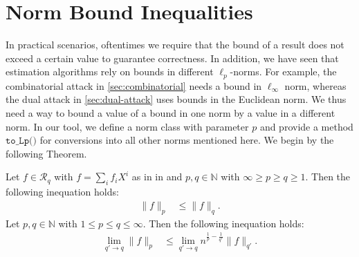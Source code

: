 \section{Norm Bound Inequalities} \label{sec:norm-bounds}%
In practical scenarios, oftentimes we require that the bound of a result does not exceed a certain value to guarantee correctness. In addition, we have seen that estimation algorithms rely on bounds in different $\ell_p$-norms. For example, the combinatorial attack in \cref{sec:combinatorial} needs a bound in $\ell_\infty$ norm, whereas the dual attack in \cref{sec:dual-attack} uses bounds in the Euclidean norm. We thus need a way to bound a value of a bound in one norm by a value in a different norm. In our tool, we define a norm class with parameter $p$ and provide a  method $\texttt{to\_Lp()}$ for conversions into all other norms mentioned here. We begin by the following Theorem.
\begin{theorem}\label{th:norm-rel1}
    Let $f \in \mathcal{R}_q$ with $f = \sum_i f_i X^i$ as in in \cite{BDLOP18} and $p, q \in \mathbb{N}$ with $\infty \geq p \geq q \geq 1$. Then the following inequation holds:
    \begin{align}
        \| f \|_p & \leq \| f \|_q \label{eq:norm-inf-leq-1}.
    \end{align}
    Let $p, q \in \mathbb{N}$ with $1 \leq p \leq q \leq \infty$. Then the following inequation holds:
    \begin{align}
        \lim_{q' \rightarrow q}\| f \|_p & \leq \lim_{q' \rightarrow q} n^{\frac{1}{p} - \frac{1}{q'}}\| f \|_{q'} \label{eq:norm-1-leq-inf}.
    \end{align}
\end{theorem}

